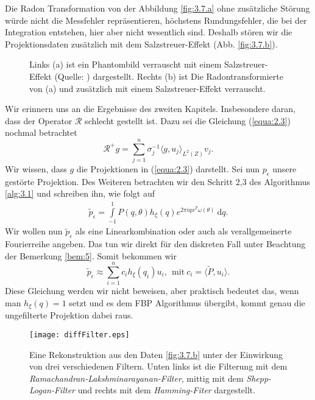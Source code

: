 Die Radon Transformation von der Abbildung \ref{fig:3.7.a} ohne zusätzliche Störung würde nicht die Messfehler repräsentieren, höchstens Rundungsfehler, die bei der Integration entstehen, hier aber nicht wesentlich sind. Deshalb stören wir die Projektionsdaten zusätzlich mit dem Salzstreuer-Effekt (Abb. \ref{fig:3.7.b}).
\begin{figure}[!h]
	\begin{center}
	\end{center}
	\caption{ Links (a) ist ein Phantombild verrauscht mit einem Salzstreuer-Effekt (Quelle: \MATLAB) dargestellt. Rechts (b) ist Die Radontransformierte von (a) und zusätzlich mit einem Salzstreuer-Effekt verrauscht.}
	\label{fig:3.7}
\end{figure} 

Wir erinnern uns an die Ergebnisse des zweiten Kapitels. Insbesondere daran, dass der Operator $\mathcal{R}$ schlecht gestellt ist. Dazu sei die Gleichung (\ref{equa:2.3}) nochmal betrachtet
\[\mathcal{R}^{+} g  = \sum\limits_{j = 1}^{n} \sigma_j^{-1} \langle g, u_j \rangle_{L^2(Z)} v_j.\]
Wir wissen, dass $g$ die Projektionen in (\ref{equa:2.3}) darstellt. Sei nun $p_{\epsilon}$ unsere gestörte Projektion. Des Weiteren betrachten wir den Schritt 2,3 des Algorithmus \ref{alg:3.1} und schreiben ihn, wie folgt auf
\begin{eqnarray}
	\tilde{p}_{\epsilon} = \int \limits_{-1}^{1} P(q, \theta)h_{\xi}(q) e^{2\pi i qx^T\omega(\theta)} \ \mbox{d}q.
	\label{equa:3.19}
\end{eqnarray}
Wir wollen nun $\tilde{p}_{\epsilon}$ als eine Linearkombination oder auch als verallgemeinerte Fourierreihe angeben. Das tun wir direkt für den diskreten Fall unter Beachtung der Bemerkung \ref{bem:5}. Somit bekommen wir
\begin{equation}
	\tilde{p}_{\epsilon} \approx \sum \limits_{i = 1}^{n} c_ih_{\xi}(q_i)u_i, \ \ \mbox{mit} \  c_i = \langle \tilde{P}, u_i \rangle.
	\label{equa:3.20}
\end{equation} 
Diese Gleichung werden wir nicht beweisen, aber praktisch bedeutet das, wenn man $h_{\xi}(q) = 1$ setzt und es dem FBP Algorithmus übergibt, kommt genau die ungefilterte Projektion dabei raus.
\begin{figure}[!h]
	\centering
	\texttt{[image: diffFilter.eps]}
	\caption{Eine Rekonstruktion aus den Daten \ref{fig:3.7.b} unter der Einwirkung von drei verschiedenen Filtern. Unten links ist die Filterung mit dem \textit{Ramachandran-Lakshminarayanan-Filter}, mittig mit dem \textit{Shepp-Logan-Filter} und rechts mit dem \textit{Hamming-Fiter} dargestellt.}  
	\label{fig:3.8}
\end{figure}

